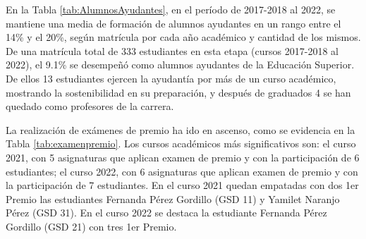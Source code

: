 En la Tabla \ref{tab:AlumnosAyudantes}, en el período de 2017-2018 al 2022, se mantiene una media de formación de alumnos ayudantes en un rango entre el 14\% y el 20\%, según matrícula por cada año académico y cantidad de los mismos. De una matrícula total de 333 estudiantes en esta etapa (cursos 2017-2018 al 2022), el 9.1\% se desempeñó como alumnos ayudantes de la Educación Superior. De ellos 13 estudiantes ejercen la ayudantía por más de un curso académico, mostrando la sostenibilidad en su preparación, y después de graduados 4 se han quedado como profesores de la carrera. 

La realización de exámenes de premio ha ido en ascenso, como se evidencia en la Tabla \ref{tab:examenpremio}. Los cursos académicos más significativos son: el curso 2021, con 5 asignaturas que aplican examen de premio y con la participación de 6 estudiantes; el curso 2022, con 6 asignaturas que aplican examen de premio y con la participación de 7 estudiantes. En el curso 2021 quedan empatadas con dos 1er Premio las estudiantes Fernanda Pérez Gordillo (GSD 11) y Yamilet Naranjo Pérez (GSD 31). En el curso 2022 se destaca la estudiante Fernanda Pérez Gordillo (GSD 21) con tres 1er Premio.

